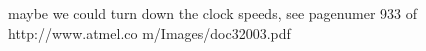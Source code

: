 maybe we could turn down the clock speeds, see pagenumer 933 of http://www.atmel.co    m/Images/doc32003.pdf


